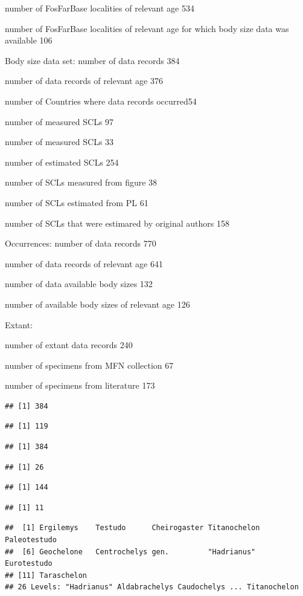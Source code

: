 \documentclass[]{article}
\begin{document}
number of FosFarBase localities of relevant age 534

number of FosFarBase localities of relevant age for which body size data
was available 106

Body size data set: number of data records 384

number of data records of relevant age 376

number of Countries where data records occurred54

number of measured SCLs 97

number of measured SCLs 33

number of estimated SCLs 254

number of SCLs measured from figure 38

number of SCLs estimated from PL 61

number of SCLs that were estimared by original authors 158

Occurrences: number of data records 770

number of data records of relevant age 641

number of data available body sizes 132

number of available body sizes of relevant age 126

Extant:

number of extant data records 240

number of specimens from MFN collection 67

number of specimens from literature 173

\begin{verbatim}
## [1] 384
\end{verbatim}

\begin{verbatim}
## [1] 119
\end{verbatim}

\begin{verbatim}
## [1] 384
\end{verbatim}

\begin{verbatim}
## [1] 26
\end{verbatim}

\begin{verbatim}
## [1] 144
\end{verbatim}

\begin{verbatim}
## [1] 11
\end{verbatim}

\begin{verbatim}
##  [1] Ergilemys    Testudo      Cheirogaster Titanochelon Paleotestudo
##  [6] Geochelone   Centrochelys gen.         "Hadrianus"  Eurotestudo 
## [11] Taraschelon 
## 26 Levels: "Hadrianus" Aldabrachelys Caudochelys ... Titanochelon
\end{verbatim}
\end{document}
